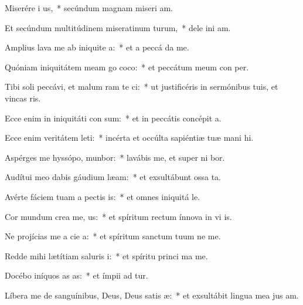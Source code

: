 \item Miserére i us,~* secúndum magnam miseri am.
\item Et secúndum multitúdinem miseratinum turum,~* dele ini am.
\item Amplius lava me ab iniquite a:~* et a peccá  da me.
\item Quóniam iniquitátem meam go coco:~* et peccátum meum con   per.
\item Tibi soli peccávi, et malum ram te ci:~* ut justificéris in sermónibus tuis, et vincas  ris.
\item Ecce enim in iniquitáti con sum:~* et in peccátis concépit   a.
\item Ecce enim veritátem leti:~* incérta et occúlta sapiéntiæ tuæ mani hi.
\item Aspérges me hyssópo,  munbor:~* lavábis me, et super ni bor.
\item Audítui meo dabis gáudium  læam:~* et exsultábunt ossa ta.
\item Avérte fáciem tuam a pectis is:~* et omnes iniquitá  le.
\item Cor mundum crea  me, us:~* et spíritum rectum ínnova in vi is.
\item Ne projícias me a cie a:~* et spíritum sanctum tuum ne   me.
\item Redde mihi lætítiam saluris i:~* et spíritu princi ma me.
\item Docébo iníquos as as:~* et ímpii ad  tur.
\item Líbera me de sanguínibus, Deus, Deus satis æ:~* et exsultábit lingua mea jus am.
